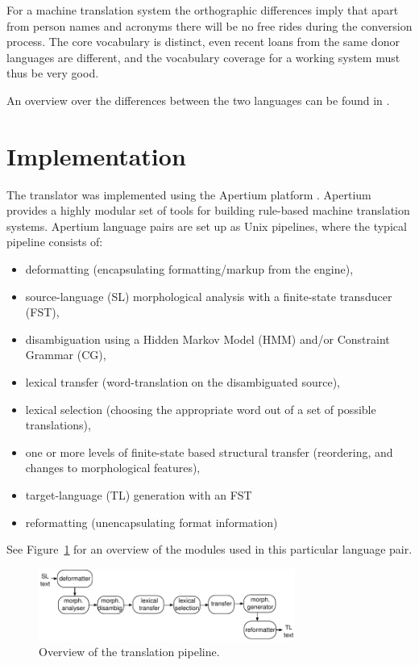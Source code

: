 \documentclass[a4paper,11pt,twocolumn]{article}
\begin{document}
For a machine translation system the orthographic differences imply
that apart from person names and acronyms there will be no free rides
during the conversion process. The core vocabulary is distinct, even
recent loans from the same donor languages are different, and the
vocabulary coverage for a working system must thus be very good.

An overview over the differences between the two languages can
be found in \cite{sammallahti98}.


\section{Implementation}

The translator was implemented using the Apertium platform \cite{forcada2011}. Apertium 
provides a highly modular set of tools for building rule-based
machine translation systems. Apertium language pairs are set up as Unix pipelines, where the
typical pipeline consists of:

\begin{itemize}
\item deformatting (encapsulating formatting/markup from the engine),
\item source-language (SL) morphological analysis with a finite-state
  transducer (FST),
\item disambiguation using a Hidden Markov Model (HMM) and/or
  Constraint Grammar (CG), 
\item lexical transfer (word-translation on the disambiguated source),
\item lexical selection (choosing the appropriate word out of a set of possible
   translations),
\item one or more levels of finite-state based structural transfer
  (reordering, and changes to morphological features),
\item target-language (TL) generation with an FST
\item reformatting (unencapsulating format information)
\end{itemize}

See Figure~\ref{fig:pipeline} for an overview of the modules used
in this particular language pair.

\begin{figure}
 \centering
 \includegraphics[width=0.75\textwidth]{architecture-overview.pdf}
 \caption{Overview of the translation pipeline.}
 \label{fig:pipeline}
\end{figure}
\end{document}
